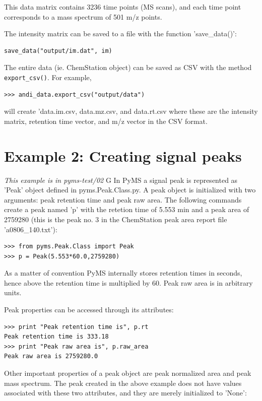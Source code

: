 \noindent
This data matrix contains 3236 time points (MS scans), and each time point
corresponds to a mass spectrum of 501 m/z points.

The intensity matrix can be saved to a file with the function 'save\_data()':

\begin{verbatim}
save_data("output/im.dat", im)
\end{verbatim}

The entire data (ie. ChemStation object) can be saved as CSV with the method
{\tt export\_csv()}. For example,

\begin{verbatim}
>>> andi_data.export_csv("output/data")
\end{verbatim}

\noindent
will create 'data.im.csv, data.mz.csv, and data.rt.csv where these are the
intensity matrix, retention time vector, and m/z vector in the CSV format.

\section{Example 2: Creating signal peaks}

\noindent
{\em This example is in pyms-test/02}
G
In PyMS a signal peak is represented as 'Peak' object defined in
pyms.Peak.Class.py. A peak object is initialized with two arguments:
peak retention time and peak raw area. The following commands create
a peak named 'p' with the retetion time of 5.553 min and a peak area
of 2759280 (this is the peak no. 3 in the ChemStation peak area report
file 'a0806\_140.txt'):

\begin{verbatim}
>>> from pyms.Peak.Class import Peak
>>> p = Peak(5.553*60.0,2759280)
\end{verbatim}

\noindent
As a matter of convention PyMS internally stores retention times in
seconds, hence above the retention time is multiplied by 60. Peak
raw area is in arbitrary units.

Peak properties can be accessed through its attributes:

\begin{verbatim}
>>> print "Peak retention time is", p.rt
Peak retention time is 333.18
>>> print "Peak raw area is", p.raw_area
Peak raw area is 2759280.0
\end{verbatim}

\noindent
Other important properties of a peak object are peak normalized area
and peak mass spectrum. The peak created in the above example does
not have values associated with these two attributes, and they are
merely initialized to 'None':

